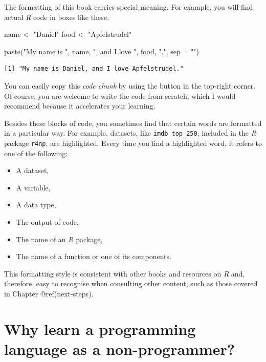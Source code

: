 \documentclass[
  letterpaper,
]{krantz}
\makeatletter
\newenvironment{Shaded}{\begin{snugshade}}{\end{snugshade}}
\newcommand{\AttributeTok}[1]{\textcolor[rgb]{0.40,0.45,0.13}{#1}}
\newcommand{\FunctionTok}[1]{\textcolor[rgb]{0.28,0.35,0.67}{#1}}
\newcommand{\NormalTok}[1]{\textcolor[rgb]{0.00,0.23,0.31}{#1}}
\newcommand{\OtherTok}[1]{\textcolor[rgb]{0.00,0.23,0.31}{#1}}
\newcommand{\StringTok}[1]{\textcolor[rgb]{0.13,0.47,0.30}{#1}}
\newenvironment{kframe}{%
\medskip{}
\setlength{\fboxsep}{.8em}
 \def\at@end@of@kframe{}%
 \ifinner\ifhmode%
  \def\at@end@of@kframe{\end{minipage}}%
  \begin{minipage}{\columnwidth}%
 \fi\fi%
 \def\FrameCommand##1{\hskip\@totalleftmargin \hskip-\fboxsep
 \colorbox{shadecolor}{##1}\hskip-\fboxsep
     \hskip-\linewidth \hskip-\@totalleftmargin \hskip\columnwidth}%
 \MakeFramed {\advance\hsize-\width
   \@totalleftmargin\z@ \linewidth\hsize
   \@setminipage}}%
 {\par\unskip\endMakeFramed%
 \at@end@of@kframe}
\renewenvironment{Shaded}{\begin{kframe}}{\end{kframe}}
\makeatother
\begin{document}
The formatting of this book carries special meaning. For example, you
will find actual \emph{R} code in boxes like these.

\begin{Shaded}
\begin{Highlighting}[]
\NormalTok{name }\OtherTok{\textless{}{-}} \StringTok{"Daniel"}
\NormalTok{food }\OtherTok{\textless{}{-}} \StringTok{"Apfelstrudel"}

\FunctionTok{paste}\NormalTok{(}\StringTok{"My name is "}\NormalTok{, name, }\StringTok{", and I love "}\NormalTok{, food, }\StringTok{"."}\NormalTok{, }\AttributeTok{sep =} \StringTok{""}\NormalTok{)}
\end{Highlighting}
\end{Shaded}

\begin{verbatim}
[1] "My name is Daniel, and I love Apfelstrudel."
\end{verbatim}

You can easily copy this \emph{code chunk} by using the button in the
top-right corner. Of course, you are welcome to write the code from
scratch, which I would recommend because it accelerates your learning.

Besides these blocks of code, you sometimes find that certain words are
formatted in a particular way. For example, datasets, like
\texttt{imdb\_top\_250}, included in the \emph{R} package \texttt{r4np},
are highlighted. Every time you find a highlighted word, it refers to
one of the following:

\begin{itemize}
\item
  A dataset,
\item
  A variable,
\item
  A data type,
\item
  The output of code,
\item
  The name of an \emph{R} package,
\item
  The name of a function or one of its components.
\end{itemize}

This formatting style is consistent with other books and resources on
\emph{R} and, therefore, easy to recognise when consulting other
content, such as those covered in Chapter @ref(next-steps).


\chapter{Why learn a programming language as a
non-programmer?}\label{sec-why-learn-a-programming-language-as-a-non-programmer}
\end{document}
